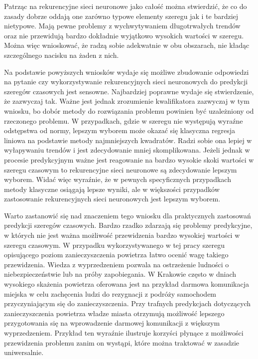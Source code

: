 \documentclass[10pt,a4paper]{article}
\begin{document}
Patrząc na rekurencyjne sieci neuronowe jako całość można stwierdzić, że co do zasady dobrze oddają one zarówno typowe elementy szeregu jak i te bardziej nietypowe. Mają pewne problemy z wychwytywaniem długotrwałych trendów oraz nie przewidują bardzo dokładnie wyjątkowo wysokich wartości w szeregu. Można więc wnioskować, że radzą sobie adekwatnie w obu obszarach, nie kładąc szczególnego nacisku na żaden z nich. 

Na podstawie powyższych wniosków wydaje się możliwe zbudowanie odpowiedzi na pytanie czy wykorzystywanie rekurencyjnych sieci neuronowych do predykcji szeregów czasowych jest sensowne. Najbardziej poprawne wydaje się stwierdzenie, że zazwyczaj tak. Ważne jest jednak zrozumienie kwalifikatora zazwyczaj w tym wniosku, bo dobór metody do rozwiązania problemu powinien być uzależniony od rzeczonego problemu. W przypadkach, gdzie w szeregu nie występują wyraźne odstępstwa od normy, lepszym wyborem może okazać się klasyczna regresja liniowa na podstawie metody najmniejszych kwadratów. Radzi sobie ona lepiej w wyłapywaniu trendów i jest zdecydowanie mniej skomplikowana. Jeżeli jednak w procesie predykcyjnym ważne jest reagowanie na bardzo wysokie skoki wartości w szeregu czasowym to rekurencyjne sieci neuronowe są zdecydowanie lepszym wyborem. Widać więc wyraźnie, że w pewnych specyficznych przypadkach metody klasyczne osiągają lepsze wyniki, ale w większości przypadków zastosowanie rekurencyjnych sieci neuronowych jest lepszym wyborem. 

Warto zastanowić się nad znaczeniem tego wniosku dla praktycznych zastosowań predykcji szeregów czasowych. Bardzo rzadko zdarzają się problemy predykcyjne, w których nie jest ważna możliwość przewidzenia bardzo wysokiej wartości w szeregu czasowym. W przypadku wykorzystywanego w tej pracy szeregu opisującego poziom zanieczyszczenia powietrza łatwo ocenić wagę takiego przewidzenia. Wiedza z wyprzedzeniem pozwala na ostrzeżenie ludności o niebezpieczeństwie lub na próby zapobiegania. W Krakowie często w dniach wysokiego skażenia powietrza oferowana jest na przykład darmowa komunikacja miejska \cite{krkFreeMPK} w celu zachęcenia ludzi do rezygnacji z podróży samochodem przyczyniającym się do zanieczyszczenia. Przy trafnych predykcjach dotyczących zanieczyszczenia powietrza władze miasta otrzymują możliwość lepszego przygotowania się na wprowadzenie darmowej komunikacji z większym wyprzedzeniem. Przykład ten wyraźnie ilustruje korzyści płynące z możliwości przewidzenia problemu zanim on wystąpi, które można traktować w zasadzie uniwersalnie. 
\end{document}
